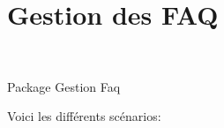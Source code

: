 \section{Gestion des FAQ}

\begin{center}
\\
\par{Package Gestion Faq}
\end{center}
Voici les diff{\'e}rents sc{\'e}narios:\\
